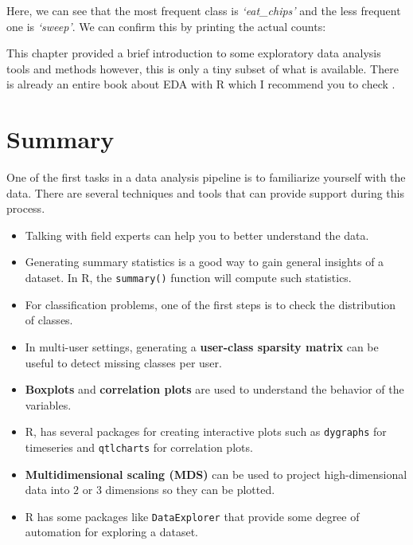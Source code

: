 \documentclass[
  11pt,
]{krantz}
\makeatletter
\newenvironment{Shaded}{\begin{snugshade}}{\end{snugshade}}
\newcommand{\CommentTok}[1]{\textcolor[rgb]{0.37,0.37,0.37}{\textit{#1}}}
\newcommand{\FunctionTok}[1]{\textcolor[rgb]{0,0,0}{#1}}
\newcommand{\NormalTok}[1]{#1}
\newcommand{\SpecialCharTok}[1]{\textcolor[rgb]{0,0,0}{#1}}
\providecommand{\tightlist}{%
  \setlength{\itemsep}{0pt}\setlength{\parskip}{0pt}}
\newenvironment{kframe}{%
\medskip{}
\setlength{\fboxsep}{.8em}
 \def\at@end@of@kframe{}%
 \ifinner\ifhmode%
  \def\at@end@of@kframe{\end{minipage}}%
  \begin{minipage}{\columnwidth}%
 \fi\fi%
 \def\FrameCommand##1{\hskip\@totalleftmargin \hskip-\fboxsep
 \colorbox{shadecolor}{##1}\hskip-\fboxsep
     \hskip-\linewidth \hskip-\@totalleftmargin \hskip\columnwidth}%
 \MakeFramed {\advance\hsize-\width
   \@totalleftmargin\z@ \linewidth\hsize
   \@setminipage}}%
 {\par\unskip\endMakeFramed%
 \at@end@of@kframe}
\newenvironment{rmdblock}[1]
  {
  \begin{itemize}
  \renewcommand{\labelitemi}{
    \raisebox{-.7\height}[0pt][0pt]{
      {\setkeys{Gin}{width=3em,keepaspectratio}\texttt{[image: images/icons/\#1]}}
    }
  }
  \setlength{\fboxsep}{1em}
  \begin{kframe}
  \item
  }
  {
  \end{kframe}
  \end{itemize}
  }
\newenvironment{rmdinfo}
  {\begin{rmdblock}{info}}
  {\end{rmdblock}}
\makeatother
\begin{document}
Here, we can see that the most frequent class is \emph{`eat\_chips'} and the less frequent one is \emph{`sweep'}. We can confirm this by printing the actual counts:

\begin{Shaded}
\end{Shaded}

\begin{rmdinfo}
This chapter provided a brief introduction to some exploratory data analysis tools and methods however, this is only a tiny subset of what is available. There is already an entire book about EDA with R which I recommend you to check \citep{peng2016}.
\end{rmdinfo}

\hypertarget{SummaryExploratory}{%
\section{Summary}\label{SummaryExploratory}}

One of the first tasks in a data analysis pipeline is to familiarize yourself with the data. There are several techniques and tools that can provide support during this process.

\begin{itemize}
\tightlist
\item
  Talking with field experts can help you to better understand the data.
\item
  Generating summary statistics is a good way to gain general insights of a dataset. In R, the \texttt{summary()} function will compute such statistics.
\item
  For classification problems, one of the first steps is to check the distribution of classes.
\item
  In multi-user settings, generating a \textbf{user-class sparsity matrix} can be useful to detect missing classes per user.
\item
  \textbf{Boxplots} and \textbf{correlation plots} are used to understand the behavior of the variables.
\item
  R, has several packages for creating interactive plots such as \texttt{dygraphs} for timeseries and \texttt{qtlcharts} for correlation plots.
\item
  \textbf{Multidimensional scaling (MDS)} can be used to project high-dimensional data into \(2\) or \(3\) dimensions so they can be plotted.
\item
  R has some packages like \texttt{DataExplorer} that provide some degree of automation for exploring a dataset.
\end{itemize}
\end{document}
